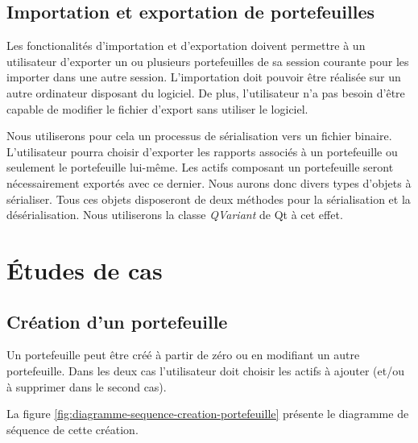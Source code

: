 \documentclass[a4paper]{report}
\begin{document}
\subsection{Importation et exportation de portefeuilles}

Les fonctionalités d'importation et d'exportation doivent permettre à un utilisateur d'exporter un ou plusieurs portefeuilles de sa session courante pour les importer dans une autre session.
L'importation doit pouvoir être réalisée sur un autre ordinateur disposant du logiciel.
De plus, l'utilisateur n'a pas besoin d'être capable de modifier le fichier d'export sans utiliser le logiciel.

Nous utiliserons pour cela un processus de sérialisation vers un fichier binaire.
L'utilisateur pourra choisir d'exporter les rapports associés à un portefeuille ou seulement le portefeuille lui-même.
Les actifs composant un portefeuille seront nécessairement exportés avec ce dernier.
Nous aurons donc divers types d'objets à sérialiser.
Tous ces objets disposeront de deux méthodes pour la sérialisation et la désérialisation.
Nous utiliserons la classe \textit{QVariant} de Qt à cet effet.


\section{\'Etudes de cas}

\subsection{Création d'un portefeuille}
Un portefeuille peut être créé à partir de zéro ou en modifiant un autre portefeuille.
Dans les deux cas l'utilisateur doit choisir les actifs à ajouter (et/ou à supprimer dans le second cas).

La figure \ref{fig:diagramme-sequence-creation-portefeuille} présente le diagramme de séquence de cette création.
\end{document}

